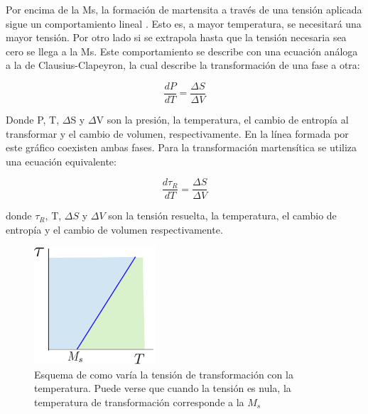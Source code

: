 \documentclass[a4paper,12pt,fleqn,twoside,openany]{book}
\begin{document}
Por encima de la Ms, la formación de martensita a través de una tensión aplicada sigue un comportamiento lineal \cite{pierre}. Esto es, a mayor temperatura, se 
necesitará una mayor tensión. Por otro lado si se extrapola hasta que la tensión necesaria sea cero se llega a la Ms. Este comportamiento se describe con una ecuación 
análoga a la de Clausius-Clapeyron, la cual describe la transformación de una fase a otra:

\begin{equation}
 \frac{dP}{dT}=\frac{\Delta S}{\Delta V}
\end{equation}

Donde P, T, $\Delta$S y $\Delta$V son la presión, la temperatura, el cambio de entropía al transformar y el cambio de volumen, respectivamente. En la línea formada por este gráfico 
coexisten ambas fases. Para la transformación martensítica se utiliza una ecuación equivalente:

\begin{equation}
 \frac{d \tau_{R}}{dT}=\frac{\Delta S}{\Delta V} 
\end{equation}

donde $\tau_{R}$, T, $\Delta S$ y $\Delta V$ son la tensión resuelta, la temperatura, el cambio de entropía y el cambio de volumen respectivamente.






\begin{figure}[h]
 \centering
 \includegraphics[width=0.4\textwidth]{clapeyron.eps}
 \caption{Esquema de como varía la tensión de transformación con la temperatura. Puede verse que cuando la tensión es nula, la temperatura de
 transformación corresponde a la $M_s$}
\end{figure}
\end{document}
